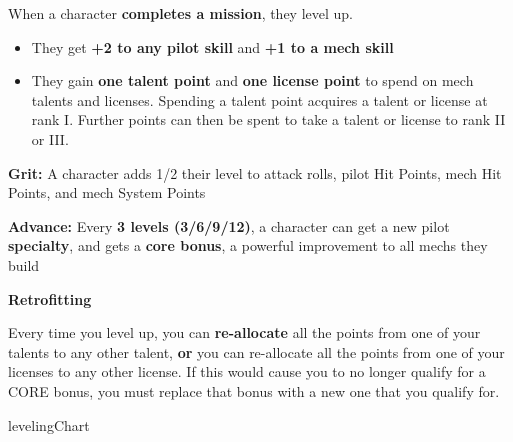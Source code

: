 When a character \textbf{completes a mission}, they level up.
\begin{itemize}
\item They get \textbf{+2 to any pilot skill} and \textbf{+1 to a mech skill}
\item They gain \textbf{one talent point} and \textbf{one license point} to spend on mech talents and
      licenses. Spending a talent point acquires a talent or license at rank I. Further
      points can then be spent to take a talent or license to rank II or III.
\end{itemize}


\textbf{Grit:} A character adds 1/2 their level to attack rolls, pilot Hit Points, mech Hit Points, and mech
System Points

\textbf{Advance:} Every \textbf{3 levels (3/6/9/12)}, a character can get a new
pilot \textbf{specialty}, and gets a \textbf{core bonus}, a powerful improvement to all mechs they build

\begin{center}
                                             \textbf{Retrofitting}
\end{center}

Every time you level up, you can \textbf{re-allocate} all the points from one of your talents to any other
talent, \textbf{or} you can re-allocate all the points from one of your licenses to any other license. If this
would cause you to no longer qualify for a CORE bonus, you must replace that bonus with a new
one that you qualify for.

{levelingChart}
